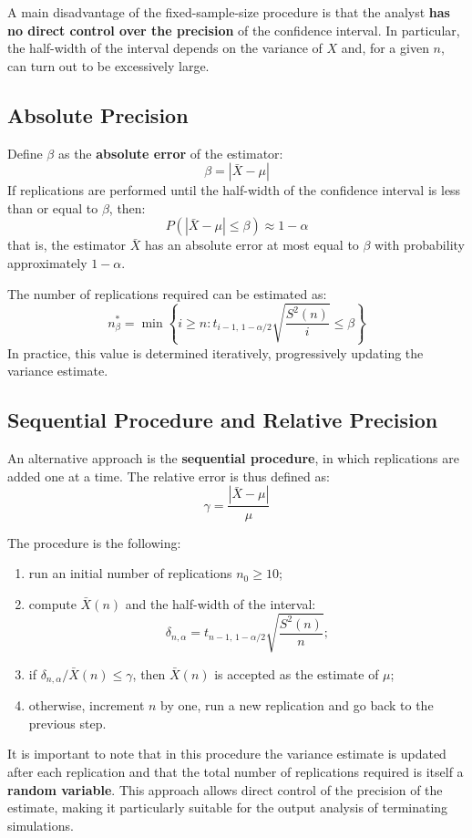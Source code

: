 A main disadvantage of the fixed-sample-size procedure is that the analyst \textbf{has no direct control over the precision} of the confidence interval. In particular, the half-width of the interval depends on the variance of $X$ and, for a given $n$, can turn out to be excessively large.

\subsection{Absolute Precision}
Define $\beta$ as the \textbf{absolute error} of the estimator:
\[
\beta = |\bar{X} - \mu|
\]
If replications are performed until the half-width of the confidence interval is less than or equal to $\beta$, then:
\[
P(|\bar{X} - \mu| \le \beta) \approx 1 - \alpha
\]
that is, the estimator $\bar{X}$ has an absolute error at most equal to $\beta$ with probability approximately $1-\alpha$.

The number of replications required can be estimated as:
\[
n_\beta^* = \min \left\{ i \ge n :
t_{i-1,\,1-\alpha/2} \sqrt{\frac{S^2(n)}{i}} \le \beta \right\}
\]
In practice, this value is determined iteratively, progressively updating the variance estimate.

\subsection{Sequential Procedure and Relative Precision}
An alternative approach is the \textbf{sequential procedure}, in which replications are added one at a time. The relative error is thus defined as:
\[
\gamma = \frac{|\bar{X} - \mu|}{\mu}
\]

The procedure is the following:
\begin{enumerate}
    \item run an initial number of replications $n_0 \ge 10$;
    \item compute $\bar{X}(n)$ and the half-width of the interval:
    \[
    \delta_{n,\alpha} =
    t_{n-1,\,1-\alpha/2} \sqrt{\frac{S^2(n)}{n}};
    \]
    \item if $\delta_{n,\alpha} / \bar{X}(n) \le \gamma$, then $\bar{X}(n)$ is accepted as the estimate of $\mu$;
    \item otherwise, increment $n$ by one, run a new replication and go back to the previous step.
\end{enumerate}

It is important to note that in this procedure the variance estimate is updated after each replication and that the total number of replications required is itself a \textbf{random variable}. This approach allows direct control of the precision of the estimate, making it particularly suitable for the output analysis of terminating simulations.

